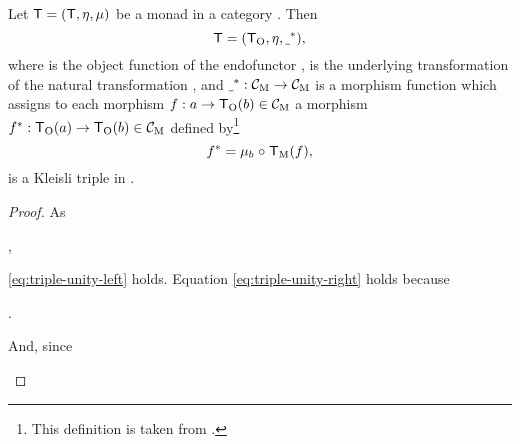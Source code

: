\begin{lemma}
  \label{lem:monad-to-triple}
  Let $\mathsf{T} = (\mathsf{T}, \eta, \mu)$ be a monad in a
  category . Then
  \begin{equation*}
    \mathsf{T} = (\mathsf{T}_{\operatorname{O}}, \eta, \underline{~}^*)
    \text{,}
  \end{equation*}
  where  is the object function of the endofunctor ,
  \nat{\eta} is the underlying transformation of the natural
  transformation \nat{\eta}, and $\underline{~}^*: \mathcal{C}_{\operatorname{M}} \to \mathcal{C}_{\operatorname{M}}$
  is a morphism function which assigns to each morphism $f : a \to
  \mathsf{T}_{\operatorname{O}}(b) \in \mathcal{C}_{\operatorname{M}}$ a morphism $f^*: \mathsf{T}_{\operatorname{O}}(a) \to
  \mathsf{T}_{\operatorname{O}}(b) \in \mathcal{C}_{\operatorname{M}}$ defined by\footnote{This definition is
    taken from \parencite[61]{moggi-1991}.}
  \begin{equation}
    \label{eq:monad-to-triple-extension}
    f^* = \mu_{b} \mathrel{\circ} \mathsf{T}_{\operatorname{M}}(f)
    \text{,}
  \end{equation}
  is a Kleisli triple in .
  \begin{proof}
    As
    \begin{steps}
        \eqby{\eqref{eq:monad-unity-right}}
      ,
    \end{steps}
    \eqref{eq:triple-unity-left} holds. Equation \eqref{eq:triple-unity-right}
    holds because
    \begin{steps}
        \eqby{\eqref{eq:monad-naturality-unit}}
        \eqby{\eqref{eq:category-identity}}
      .
    \end{steps}
    And, since
    \begin{steps}

\end{steps}
\end{proof}
\end{lemma}
